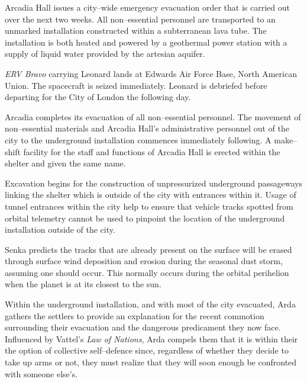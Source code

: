 Arcadia Hall issues a city--wide emergency evacuation order that is carried out over the next two weeks. All non--essential personnel are transported to an unmarked installation constructed within a subterranean lava tube. The installation is both heated and powered by a geothermal power station with a supply of liquid water provided by the artesian aquifer.
\StopTimelineDate

{\it ERV Bravo} carrying Leonard lands at Edwards Air Force Base, North American Union. The spacecraft is seized immediately. Leonard is debriefed before departing for the City of London the following day.
\StopTimelineDate

Arcadia completes its evacuation of all non--essential personnel. The movement of non--essential materials and Arcadia Hall's administrative personnel out of the city to the underground installation commences immediately following. A make--shift facility for the staff and functions of Arcadia Hall is erected within the shelter and given the same name.

Excavation begins for the construction of unpressurized underground passageways linking the shelter which is outside of the city with entrances within it. Usage of tunnel entrances within the city help to ensure that vehicle tracks spotted from orbital telemetry cannot be used to pinpoint the location of the underground installation outside of the city. 

Senka predicts the tracks that are already present on the surface will be erased through surface wind deposition and erosion during the seasonal dust storm, assuming one should occur. This normally occurs during the orbital perihelion when the planet is at its closest to the sun.

Within the underground installation, and with most of the city evacuated, Arda gathers the settlers to provide an explanation for the recent commotion surrounding their evacuation and the dangerous predicament they now face. Influenced by Vattel's {\it Law of Nations}, Arda compels them that it is within their  the option of collective self--defence since, regardless of whether they decide to take up arms or not, they must realize that they will soon enough be confronted with someone else's.

